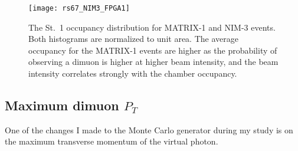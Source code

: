 \documentclass[../main.tex]{subfiles}
\begin{document}
\begin{figure}[h!]
	\centering
	\texttt{[image: rs67\_NIM3\_FPGA1]}
	\caption{The St.~1 occupancy distribution for MATRIX-1 and NIM-3 events. Both histograms are normalized
		to unit area. The average occupancy for the MATRIX-1 events are higher as the probability of observing
		a dimuon is higher at higher beam intensity, and the beam intensity correlates strongly with the chamber
		occupancy.
	}
	\label{fig:NIM3_FPGA1}
\end{figure}

\subsection{Maximum dimuon \texorpdfstring{$P_T$}{P\_T}}
\label{subsec:max_pt}
One of the changes I made to the Monte Carlo generator during my study
is on the maximum transverse momentum of the virtual photon.
\end{document}
